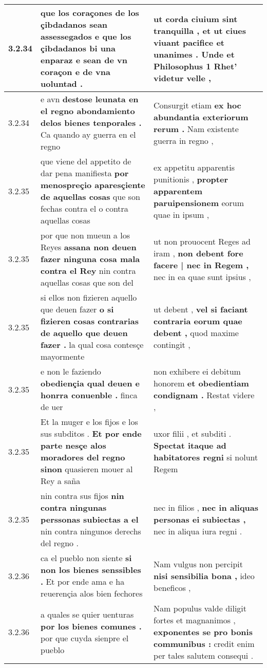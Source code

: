 \begin{tabular}{|p{1cm}|p{6.5cm}|p{6.5cm}|}
3.2.34 & que los coraçones de los çibdadanos sean assessegados \textbf{ e que los çibdadanos bi una enparaz } e sean de vn coraçon e de vna uoluntad . & ut corda ciuium sint tranquilla , \textbf{ et ut ciues viuant pacifice et unanimes . } Unde et Philosophus 1 Rhet’ videtur velle , \\\hline
3.2.34 & e avn \textbf{ destose leunata en el regno abondamiento delos bienes tenporales . } Ca quando ay guerra en el regno & Consurgit etiam \textbf{ ex hoc abundantia exteriorum rerum . } Nam existente guerra in regno , \\\hline
3.2.35 & que viene del appetito de dar pena manifiesta \textbf{ por menospreçio aparesçiente de aquellas cosas } que son fechas contra el o contra aquellas cosas & ex appetitu apparentis punitionis , \textbf{ propter apparentem paruipensionem } eorum quae in ipsum , \\\hline
3.2.35 & por que non mueun a los Reyes \textbf{ assana non deuen fazer ninguna cosa mala contra el Rey } nin contra aquellas cosas que son del & ut non prouocent Reges ad iram , \textbf{ non debent fore facere | nec in Regem , } nec in ea quae sunt ipsius , \\\hline
3.2.35 & si ellos non fizieren aquello que deuen fazer \textbf{ o si fizieren cosas contrarias de aquello que deuen fazer . } la qual cosa contesçe mayormente & ut debent , \textbf{ vel si faciant contraria eorum quae debent , } quod maxime contingit , \\\hline
3.2.35 & e non le faziendo \textbf{ obediençia qual deuen e honrra conuenble . } finca de uer & non exhibere ei debitum honorem \textbf{ et obedientiam condignam . } Restat videre , \\\hline
3.2.35 & Et la muger e los fijos e los sus subditos . \textbf{ Et por ende parte nesçe alos moradores del regno sinon } quasieren mouer al Rey a saña & uxor filii , et subditi . \textbf{ Spectat itaque ad habitatores regni } si nolunt Regem \\\hline
3.2.35 & nin contra sus fijos \textbf{ nin contra ningunas perssonas subiectas a el } nin contra ningunos derechs del regno . & nec in filios , \textbf{ nec in aliquas personas ei subiectas , } nec in aliqua iura regni . \\\hline
3.2.36 & ca el pueblo non siente \textbf{ si non los bienes senssibles . } Et por ende ama e ha reuerençia alos bien fechores & Nam vulgus non percipit \textbf{ nisi sensibilia bona , } ideo beneficos , \\\hline
3.2.36 & a quales se quier uenturas \textbf{ por los bienes comunes . } por que cuyda sienpre el pueblo & Nam populus valde diligit fortes et magnanimos , \textbf{ exponentes se pro bonis communibus : } credit enim per tales salutem consequi . \\\hline

\end{tabular}
